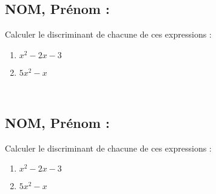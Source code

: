 \documentclass[a4paper,11pt,exos]{nsi} %
\begin{document}


\subsection*{NOM, Prénom : \dotfill} 

\maketitle

\begin{exercice}
    Calculer le discriminant de chacune de ces expressions :
    \begin{multicols}{2}
        \begin{enumerate}
            \item $x^2-2x-3$
        
            \item $5x^2-x$
        \end{enumerate}
    \end{multicols}
    
\end{exercice}

\\



\subsection*{NOM, Prénom : \dotfill} 


\maketitle


\begin{exercice}
    Calculer le discriminant de chacune de ces expressions :
    \begin{multicols}{2}
        \begin{enumerate}
            \item $x^2-2x-3$
        
            \item $5x^2-x$
        \end{enumerate}
    \end{multicols}
    
\end{exercice}
\end{document}
